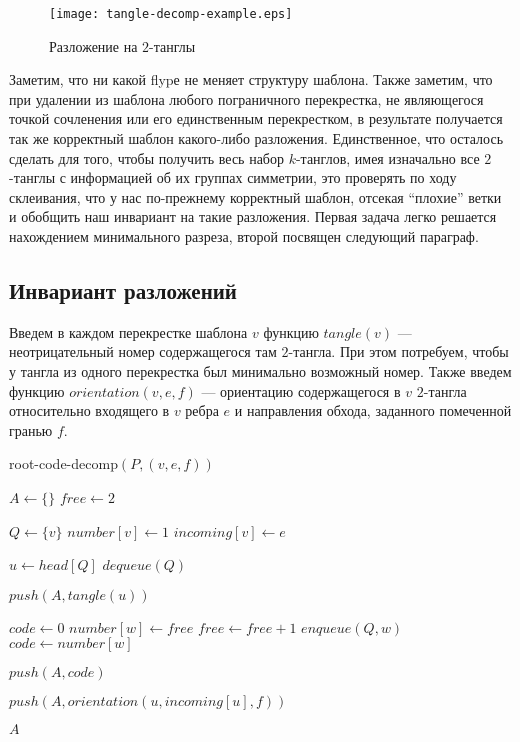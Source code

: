 		\begin{figure}[ht]
			\centering
			\texttt{[image: tangle-decomp-example.eps]}
			\caption{Разложение на $2$-танглы}
		\end{figure}

		Заметим, что ни какой flypе не меняет структуру шаблона. Также заметим, что при удалении из шаблона любого пограничного
		перекрестка, не являющегося точкой сочленения или его единственным перекрестком, в результате получается так же корректный
		шаблон какого-либо разложения. Единственное, что осталось сделать для того, чтобы получить весь набор $k$-танглов, имея
		изначально все $2$-танглы с информацией об их группах симметрии, это проверять по ходу склеивания, что у нас по-прежнему
		корректный шаблон, отсекая ``плохие'' ветки и обобщить наш инвариант на такие разложения. Первая задача легко решается
		нахождением минимального разреза, второй посвящен следующий параграф.

	\subsection{Инвариант разложений}

		Введем в каждом перекрестке шаблона $v$ функцию $tangle(v)$ --- неотрицательный номер содержащегося там $2$-тангла. При этом
		потребуем, чтобы у тангла из одного перекрестка был минимально возможный номер. Также введем функцию $orientation(v, e, f)$
		--- ориентацию содержащегося в $v$ $2$-тангла относительно входящего в $v$ ребра $e$ и направления обхода, заданного помеченной
		гранью $f$.

		\begin{algorithm}[ht]
			\caption{root-code-decomp$(P, (v, e, f))$\label{algorithm:root-code-decomp}}
			\begin{algorithmic}[1]
				\STATE $A \leftarrow \{\}$
				\STATE $free \leftarrow 2$

				\STATE $Q \leftarrow \{v\}$
				\STATE $number[v] \leftarrow 1$
				\STATE $incoming[v] \leftarrow e$

					\STATE $u \leftarrow head[Q]$
					\STATE $dequeue(Q)$

					\STATE $push(A, tangle(u))$

							\STATE $code \leftarrow 0$
						\ELSE
								\STATE $number[w] \leftarrow free$
								\STATE $free \leftarrow free + 1$
								\STATE $enqueue(Q, w)$
							\ENDIF
							\STATE $code \leftarrow number[w]$
						\ENDIF

						\STATE $push(A, code)$
					\ENDFOR

					\STATE $push(A, orientation(u, incoming[u], f))$
				\ENDWHILE

				\RETURN $A$
			\end{algorithmic}
		\end{algorithm}

